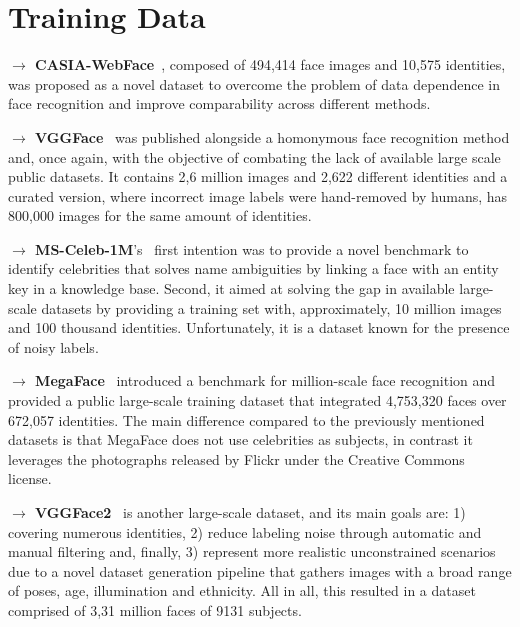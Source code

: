 \documentclass[class=report, crop=false, a4paper, 12pt]{standalone}
\begin{document}

\section*{Training Data}\label{sec:train_data_appendix}
\noindent\textbf{$\rightarrow$ CASIA-WebFace}~\autocite{yiLearningFaceRepresentation2014}, composed of 494,414 face images and 10,575 identities, was proposed as a novel dataset to overcome the problem of data dependence in face recognition and improve comparability across different methods.

\vspace{0.7\baselineskip}
\noindent\textbf{$\rightarrow$ VGGFace}~\autocite{parkhiDeepFaceRecognition2015} was published alongside a homonymous face recognition method and, once again, with the objective of combating the lack of available large scale public datasets. It contains 2,6 million images and 2,622 different identities and a curated version, where incorrect image labels were hand-removed by humans, has 800,000 images for the same amount of identities.

\vspace{0.7\baselineskip}
\noindent\textbf{$\rightarrow$ MS-Celeb-1M}'s~\autocite{guoMSCeleb1MDatasetBenchmark2016} first intention was to provide a novel benchmark to identify celebrities that solves name ambiguities by linking a face with an entity key in a knowledge base. Second, it aimed at solving the gap in available large-scale datasets by providing a training set with, approximately, 10 million images and 100 thousand identities. Unfortunately, it is a dataset known for the presence of noisy labels. 

\vspace{0.7\baselineskip}
\noindent\textbf{$\rightarrow$ MegaFace}~\autocite{nechLevelPlayingField2017} introduced a benchmark for million-scale face recognition and provided a public large-scale training dataset that integrated 4,753,320 faces over 672,057 identities. The main difference compared to the previously mentioned datasets is that MegaFace does not use celebrities as subjects, in contrast it leverages the photographs released by Flickr under the Creative Commons license. 

\vspace{0.7\baselineskip}
\noindent\textbf{$\rightarrow$ VGGFace2}~\autocite{caoVGGFace2DatasetRecognising2018} is another large-scale dataset, and its main goals are: 1) covering numerous identities, 2) reduce labeling noise through automatic and manual filtering and, finally, 3) represent more realistic unconstrained scenarios due to a novel dataset generation pipeline that gathers images with a broad range of poses, age, illumination and ethnicity. All in all, this resulted in a dataset comprised of 3,31 million faces of 9131 subjects.
\end{document}
